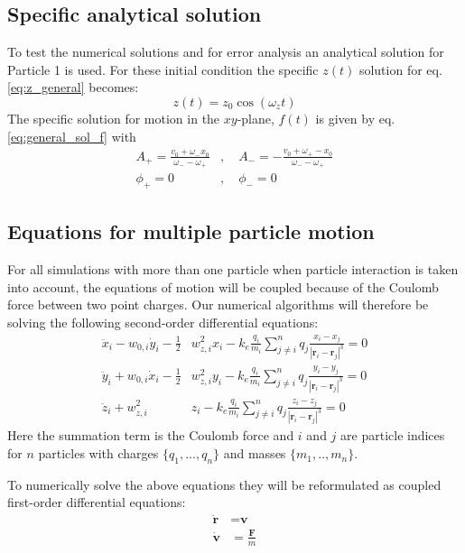 \documentclass[english,notitlepage,reprint,nofootinbib]{revtex4-1}  %
\begin{document}
\subsection*{Specific analytical solution}
To test the numerical solutions and for error analysis an analytical solution for
Particle 1 is used. For these initial condition the specific $z(t)$ solution for
eq. \ref{eq:z_general} becomes:
\begin{equation*}
    z(t) = z_0 \cos(\omega_z t)
\end{equation*}
The specific solution for motion in the $xy$-plane, $f(t)$ is given by eq. \ref{eq:general_sol_f}
with
\begin{align*}
    A_+ = \frac{v_0 + \omega_- x_0}{\omega_- - \omega_+} & , \quad A_- = -\frac{v_0 + \omega_+- x_0}{\omega_- - \omega_+} \\
    \phi_+ = 0                                           & , \quad \phi_- = 0
\end{align*}


\subsection*{Equations for multiple particle motion}
For all simulations with more than one particle when particle interaction is taken into account,
the equations of motion will be coupled because of the Coulomb force between two point charges.
Our numerical algorithms will therefore be solving the following second-order differential equations:
\begin{align}
    \ddot{x}_i - w_{0,i} \dot{y}_i - \frac{1}{2} & w_{z,i}^2 x_i - k_e \frac{q_i}{m_i} \sum_{j\neq i}^{n} q_j \frac{x_i - x_j}{|\textbf{r}_i - \textbf{r}_j|^3} = 0 \label{eq:a_x_coupled} \\
    \ddot{y}_i + w_{0,i} \dot{x}_i - \frac{1}{2} & w_{z,i}^2 y_i - k_e \frac{q_i}{m_i} \sum_{j\neq i}^{n} q_j \frac{y_i - y_j}{|\textbf{r}_i - \textbf{r}_j|^3} = 0 \label{eq:a_y_coupled} \\
    \ddot{z}_i + w_{z,i}^2                       & z_i - k_e \frac{q_i}{m_i} \sum_{j\neq i}^{n} q_j \frac{z_i - z_j}{|\textbf{r}_i - \textbf{r}_j|^3} = 0 \label{eq:a_z_coupled}
\end{align}
Here the summation term is the Coulomb force and $i$ and $j$ are particle indices for $n$ particles
with charges $\{q_1,...,q_n\}$ and masses $\{m_1,..,m_n\}$.

To numerically solve the above equations they will be reformulated as coupled first-order differential equations:
\begin{align}
    \dot{\textbf{r}} & = \textbf{v} \label{eq:position}           \\
    \dot{\textbf{v}} & = \frac{\textbf{F}}{m} \label{eq:velocity}
\end{align}
\end{document}
